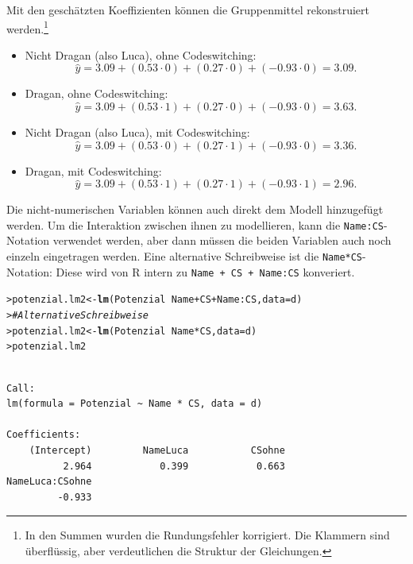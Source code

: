 \documentclass[oneside, 10pt]{book}\usepackage[]{graphicx}\usepackage[]{xcolor}
\makeatletter
\newcommand{\hlcom}[1]{\textcolor[rgb]{0.678,0.584,0.686}{\textit{#1}}}%
\newcommand{\hlopt}[1]{\textcolor[rgb]{0,0,0}{#1}}%
\newcommand{\hlstd}[1]{\textcolor[rgb]{0.345,0.345,0.345}{#1}}%
\newcommand{\hlkwb}[1]{\textcolor[rgb]{0.69,0.353,0.396}{#1}}%
\newcommand{\hlkwc}[1]{\textcolor[rgb]{0.333,0.667,0.333}{#1}}%
\newcommand{\hlkwd}[1]{\textcolor[rgb]{0.737,0.353,0.396}{\textbf{#1}}}%
\newenvironment{kframe}{%
 \def\at@end@of@kframe{}%
 \ifinner\ifhmode%
  \def\at@end@of@kframe{\end{minipage}}%
  \begin{minipage}{\columnwidth}%
 \fi\fi%
 \def\FrameCommand##1{\hskip\@totalleftmargin \hskip-\fboxsep
 \colorbox{shadecolor}{##1}\hskip-\fboxsep
     \hskip-\linewidth \hskip-\@totalleftmargin \hskip\columnwidth}%
 \MakeFramed {\advance\hsize-\width
   \@totalleftmargin\z@ \linewidth\hsize
   \@setminipage}}%
 {\par\unskip\endMakeFramed%
 \at@end@of@kframe}
\newenvironment{knitrout}{}{} %
\makeatother
\begin{document}
Mit den geschätzten Koeffizienten können die Gruppenmittel
rekonstruiert werden.\footnote{In den Summen wurden die Rundungsfehler korrigiert.
Die Klammern sind überflüssig, aber verdeutlichen die Struktur der Gleichungen.}
\begin{itemize}
 \item Nicht Dragan (also Luca), ohne Codeswitching:
  \[
    \widehat{y} = 3.09 + (0.53 \cdot 0) + (0.27 \cdot 0) + (-0.93 \cdot 0) = 3.09.
  \]

 \item Dragan, ohne Codeswitching:
  \[
    \widehat{y} = 3.09 + (0.53 \cdot 1) + (0.27 \cdot 0) + (-0.93 \cdot 0) = 3.63.
  \]

 \item Nicht Dragan (also Luca), mit Codeswitching:
  \[
    \widehat{y} = 3.09 + (0.53 \cdot 0) + (0.27 \cdot 1) + (-0.93 \cdot 0) = 3.36.
  \]

 \item Dragan, mit Codeswitching:
  \[
    \widehat{y} = 3.09 + (0.53 \cdot 1) + (0.27 \cdot 1) + (-0.93 \cdot 1) = 2.96.
  \]
\end{itemize}

Die nicht-numerischen Variablen können auch direkt dem Modell hinzugefügt werden.
Um die Interaktion zwischen ihnen zu modellieren, kann die \texttt{Name:CS}-Notation verwendet werden,
aber dann müssen die beiden Variablen auch noch einzeln eingetragen werden.
Eine alternative Schreibweise ist die \texttt{Name*CS}-Notation: Diese wird von R intern zu
\texttt{Name + CS + Name:CS} konveriert.
\begin{knitrout}
\color{fgcolor}\begin{kframe}
\begin{alltt}
\hlstd{> }\hlstd{potenzial.lm2} \hlkwb{<-} \hlkwd{lm}\hlstd{(Potenzial} \hlopt{~} \hlstd{Name} \hlopt{+} \hlstd{CS} \hlopt{+} \hlstd{Name}\hlopt{:}\hlstd{CS,} \hlkwc{data} \hlstd{= d)}
\hlstd{> }\hlcom{# Alternative Schreibweise}
\hlstd{> }\hlstd{potenzial.lm2} \hlkwb{<-} \hlkwd{lm}\hlstd{(Potenzial} \hlopt{~} \hlstd{Name}\hlopt{*}\hlstd{CS,} \hlkwc{data} \hlstd{= d)}
\hlstd{> }\hlstd{potenzial.lm2}
\end{alltt}
\begin{verbatim}

Call:
lm(formula = Potenzial ~ Name * CS, data = d)

Coefficients:
    (Intercept)         NameLuca           CSohne  
          2.964            0.399            0.663  
NameLuca:CSohne  
         -0.933  
\end{verbatim}
\end{kframe}
\end{knitrout}
\end{document}
